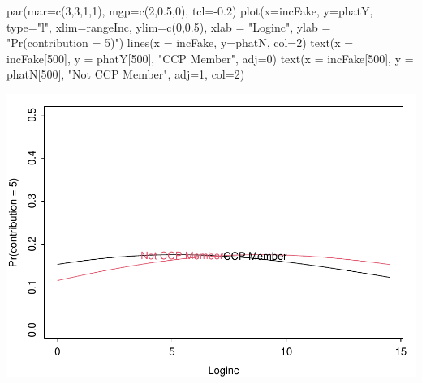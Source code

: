 \documentclass[
]{ctexart}
\newenvironment{Shaded}{\begin{snugshade}}{\end{snugshade}}
\newcommand{\AttributeTok}[1]{\textcolor[rgb]{0.77,0.63,0.00}{#1}}
\newcommand{\DecValTok}[1]{\textcolor[rgb]{0.00,0.00,0.81}{#1}}
\newcommand{\FloatTok}[1]{\textcolor[rgb]{0.00,0.00,0.81}{#1}}
\newcommand{\FunctionTok}[1]{\textcolor[rgb]{0.00,0.00,0.00}{#1}}
\newcommand{\NormalTok}[1]{#1}
\newcommand{\SpecialCharTok}[1]{\textcolor[rgb]{0.00,0.00,0.00}{#1}}
\newcommand{\StringTok}[1]{\textcolor[rgb]{0.31,0.60,0.02}{#1}}
\begin{document}
\begin{Shaded}
\begin{Highlighting}[]
\FunctionTok{par}\NormalTok{(}\AttributeTok{mar=}\FunctionTok{c}\NormalTok{(}\DecValTok{3}\NormalTok{,}\DecValTok{3}\NormalTok{,}\DecValTok{1}\NormalTok{,}\DecValTok{1}\NormalTok{), }\AttributeTok{mgp=}\FunctionTok{c}\NormalTok{(}\DecValTok{2}\NormalTok{,}\FloatTok{0.5}\NormalTok{,}\DecValTok{0}\NormalTok{), }\AttributeTok{tcl=}\SpecialCharTok{{-}}\FloatTok{0.2}\NormalTok{)}
\FunctionTok{plot}\NormalTok{(}\AttributeTok{x=}\NormalTok{incFake, }\AttributeTok{y=}\NormalTok{phatY, }\AttributeTok{type=}\StringTok{"l"}\NormalTok{, }\AttributeTok{xlim=}\NormalTok{rangeInc, }\AttributeTok{ylim=}\FunctionTok{c}\NormalTok{(}\DecValTok{0}\NormalTok{,}\FloatTok{0.5}\NormalTok{),}
    \AttributeTok{xlab =} \StringTok{"Loginc"}\NormalTok{, }\AttributeTok{ylab =} \StringTok{"Pr(contribution = 5)"}\NormalTok{)}
\FunctionTok{lines}\NormalTok{(}\AttributeTok{x =}\NormalTok{ incFake, }\AttributeTok{y=}\NormalTok{phatN, }\AttributeTok{col=}\DecValTok{2}\NormalTok{)}
\FunctionTok{text}\NormalTok{(}\AttributeTok{x =}\NormalTok{ incFake[}\DecValTok{500}\NormalTok{], }\AttributeTok{y =}\NormalTok{ phatY[}\DecValTok{500}\NormalTok{], }\StringTok{"CCP Member"}\NormalTok{, }\AttributeTok{adj=}\DecValTok{0}\NormalTok{)}
\FunctionTok{text}\NormalTok{(}\AttributeTok{x =}\NormalTok{ incFake[}\DecValTok{500}\NormalTok{], }\AttributeTok{y =}\NormalTok{ phatN[}\DecValTok{500}\NormalTok{], }\StringTok{"Not CCP Member"}\NormalTok{, }\AttributeTok{adj=}\DecValTok{1}\NormalTok{, }\AttributeTok{col=}\DecValTok{2}\NormalTok{)}
\end{Highlighting}
\end{Shaded}

\includegraphics{hwk05_files/figure-latex/unnamed-chunk-7-1.pdf}
\end{document}

